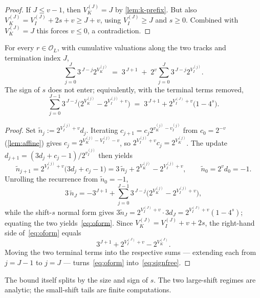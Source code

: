 \documentclass[11pt,reqno]{amsart}
\newcommand{\Obs}{\mathcal{O}}
\newcommand{\Vk}{V_{K}}
\newcommand{\Vi}{V_{I}}
\newcommand{\vk}{v_{K}}
\newcommand{\vi}{v_{I}}
\begin{document}
\begin{proof}
If $J \le v-1$, then $\Vk^{(J)} = J$ by \cref{lem:k-prefix}. But also
$\Vk^{(J)} = \Vi^{(J)} + 2s + v \ge J + v$, using $\Vi^{(J)} \ge J$ and
$s \ge 0$. Combined with $\Vk^{(J)} = J$ this forces $v \le 0$, a
contradiction.
\qedhere
\end{proof}

\begin{lemma}\label{lem:signfree}
For every $r \in \Obs_L$, with cumulative valuations along the two tracks and
termination index $J$,
\begin{equation}\label{eq:signfree}
\sum_{j=0}^{J} 3^{\,J-j} 2^{\Vk^{(j)}}
   \;=\; 3^{\,J+1} \;+\; 2^{v} \sum_{j=0}^{J} 3^{\,J-j} 2^{\Vi^{(j)}}.
\end{equation}
The sign of $s$ does not enter; equivalently, with the terminal terms removed,
\begin{equation}\label{eq:oform}
\sum_{j=0}^{J-1} 3^{\,J-j}\bigl(2^{\Vk^{(j)}} - 2^{\Vi^{(j)}+v}\bigr)
   \;=\; 3^{\,J+1} + 2^{\Vi^{(J)}+v}\bigl(1 - 4^{s}\bigr).
\end{equation}
\end{lemma}

\begin{proof}
Set $\tilde n_j := 2^{\Vi^{(j)}+v} d_j$. Iterating
$c_{j+1} = c_j 2^{\vk^{(j)} - \vi^{(j)}}$ from $c_0 = 2^{-v}$ (\cref{lem:affine})
gives $c_j = 2^{\Vk^{(j)} - \Vi^{(j)} - v}$, so $2^{\Vi^{(j)}+v} c_j = 2^{\Vk^{(j)}}$.
The update $d_{j+1} = (3 d_j + c_j - 1)/2^{\vi^{(j)}}$ then yields
\[
\tilde n_{j+1} = 2^{\Vi^{(j)}+v}\bigl(3 d_j + c_j - 1\bigr)
   = 3\,\tilde n_j + 2^{\Vk^{(j)}} - 2^{\Vi^{(j)}+v},
\qquad \tilde n_0 = 2^{v} d_0 = -1 .
\]
Unrolling the recurrence from $\tilde n_0 = -1$,
\[
3\,\tilde n_J = -3^{J+1} + \sum_{j=0}^{J-1} 3^{\,J-j}\bigl(2^{\Vk^{(j)}} - 2^{\Vi^{(j)}+v}\bigr),
\]
while the shift-$s$ normal form gives
$3 \tilde n_J = 2^{\Vi^{(J)}+v} \cdot 3 d_J = 2^{\Vi^{(J)}+v}(1 - 4^{s})$; equating
the two yields~\eqref{eq:oform}. Since
$\Vk^{(J)} = \Vi^{(J)} + v + 2s$, the right-hand side of~\eqref{eq:oform} equals
\[
3^{J+1} + 2^{\Vi^{(J)}+v} - 2^{\Vk^{(J)}} .
\]
Moving the two terminal terms into the respective sums --- extending each from
$j = J-1$ to $j = J$ --- turns~\eqref{eq:oform} into~\eqref{eq:signfree}.
\qedhere
\end{proof}

The bound itself splits by the size and sign of $s$. The two large-shift regimes
are analytic; the small-shift tails are finite computations.
\end{document}

